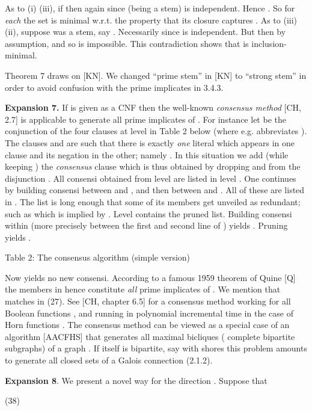 \documentclass[11pt]{article}
\begin{document}
As to (i)  (iii), if  then again  since  (being a stem) is independent. Hence . So for {\it each}  the set  is minimal w.r.t. the property that its closure captures . As to (iii)  (ii), suppose  was a stem, say . Necessarily  since  is independent. But then  by assumption, and so  is impossible. This contradiction shows that  is inclusion-minimal. \quad 

Theorem 7 draws on [KN]. We changed ``prime stem'' in [KN] to ``strong stem'' in order to avoid confusion with the prime implicates in 3.4.3. 



{\bf Expansion 7.} If  is given as a CNF then the well-known {\it consensus method} [CH, 2.7] is applicable to generate all prime implicates of . For instance let  be the conjunction of the four clauses at level  in Table 2 below (where e.g.  abbreviates ). The clauses  and  are such that there is exactly {\it one} literal  which appears in one clause and its negation in the other; namely . In this situation we add (while keeping ) the {\it consensus} clause  which is thus obtained by dropping  and  from the disjunction . All consensi obtained from level  are listed in level . One continues by building consensi between  and , and then between  and . All of these are listed in . The list  is long enough that some of its members get unveiled as redundant; such as  which is implied by . Level  contains the pruned list. Building consensi within  (more precisely between the first and second line of ) yields . Pruning  yields .



Table 2: The consensus  algorithm (simple version)

Now  yields no new consensi. According to a famous 1959 theorem of Quine [Q] the members in  hence constitute {\it all} prime implicates of . We mention that  matches  in (27). See [CH, chapter 6.5] for a consensus method working for all Boolean functions , and running in polynomial incremental time in the case of Horn functions . The consensus method can be viewed as a special case of an algorithm [AACFHS] that generates all maximal bicliques ( complete bipartite subgraphs) of a graph . If  itself is bipartite, say with shores  this problem amounts to generate all closed sets of a Galois connection (2.1.2). 



{\bf Expansion 8}. We present a novel way for the direction . 
Suppose that

(38) \quad 
\end{document}
